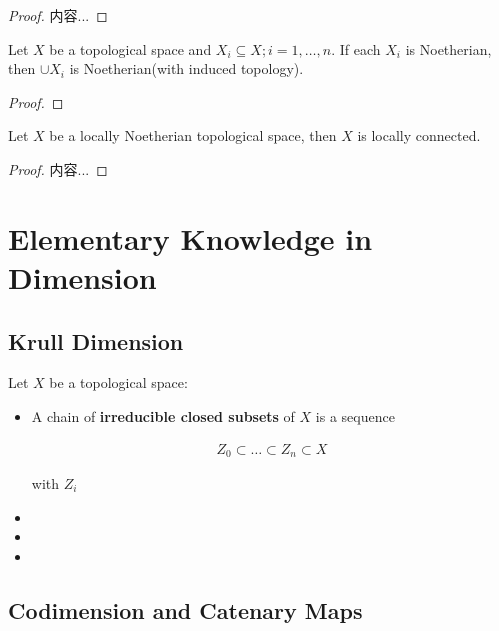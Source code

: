 \documentclass[Total.tex]{subfiles}
\begin{document}
			\begin{proof}
				内容...
			\end{proof}
			
			\begin{lemma}
				Let $X$ be a topological space and $X_i\subseteq X;i=1,\dots,n$. If each $X_i$ is Noetherian, then $\cup X_i$ is Noetherian(with induced topology).
			\end{lemma}
			
			\begin{proof}
				
			\end{proof}
			
			\begin{lemma}
				Let $X$ be a locally Noetherian topological space, then $X$ is locally connected.
			\end{lemma}
			
			\begin{proof}
				内容...
			\end{proof}
		\section{Elementary Knowledge in Dimension}
		
			\subsection{Krull Dimension}
				
				\begin{Def}
					Let $X$ be a topological space:
					
					\begin{itemize}
						\item A chain of \textbf{irreducible closed subsets} of $X$ is a sequence
						
						\begin{gather*}
							Z_0\subset\dots \subset Z_n\subset X
						\end{gather*} 
						
						with $Z_i$ 
						
						\item 
						\item 
						\item 
					\end{itemize}
				\end{Def}
				
				
			
			\subsection{Codimension and Catenary Maps}
			
\end{document}
